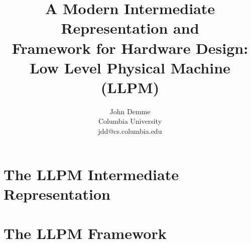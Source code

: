 \documentclass[10pt,twocolumn]{report}
\begin{document}
\title{A Modern Intermediate Representation and \\
Framework for Hardware Design: \\
Low Level Physical Machine (LLPM)}

\author{
John Demme \\
   Columbia University\\
   jdd@cs.columbia.edu
}

\date{}
\maketitle




\chapter{The LLPM Intermediate Representation}

\chapter{The LLPM Framework}




\end{document}
